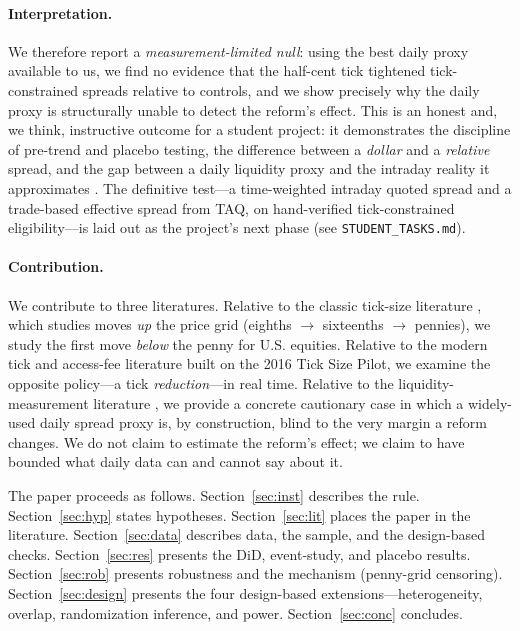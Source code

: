 \documentclass[12pt]{article}
\begin{document}
\paragraph{Interpretation.} We therefore report a \emph{measurement-limited null}: using the
best daily proxy available to us, we find no evidence that the half-cent tick tightened
tick-constrained spreads relative to controls, and we show precisely why the daily proxy is
structurally unable to detect the reform's effect. This is an honest and, we think,
instructive outcome for a student project: it demonstrates the discipline of pre-trend and
placebo testing, the difference between a \emph{dollar} and a \emph{relative} spread, and the
gap between a daily liquidity proxy and the intraday reality it approximates
\citep{holden2014,chung2014}. The definitive test---a time-weighted intraday quoted spread
and a trade-based effective spread from TAQ, on hand-verified tick-constrained eligibility---is
laid out as the project's next phase (see \texttt{STUDENT\_TASKS.md}).

\paragraph{Contribution.} We contribute to three literatures. Relative to the classic
tick-size literature \citep{harris1994,angel1997,goldstein2000,bessembinder2003}, which
studies moves \emph{up} the price grid (eighths $\to$ sixteenths $\to$ pennies), we study
the first move \emph{below} the penny for U.S. equities. Relative to the modern tick and
access-fee literature \citep{ohara2019,comerton2019,albuquerque2020} built on the 2016 Tick
Size Pilot, we examine the opposite policy---a tick \emph{reduction}---in real time.
Relative to the liquidity-measurement literature \citep{corwin2012,chung2014,holden2014}, we
provide a concrete cautionary case in which a widely-used daily spread proxy is, by
construction, blind to the very margin a reform changes. We do not claim to estimate the
reform's effect; we claim to have bounded what daily data can and cannot say about it.

The paper proceeds as follows. Section~\ref{sec:inst} describes the rule. Section~\ref{sec:hyp}
states hypotheses. Section~\ref{sec:lit} places the paper in the literature.
Section~\ref{sec:data} describes data, the sample, and the design-based checks.
Section~\ref{sec:res} presents the DiD, event-study, and placebo results.
Section~\ref{sec:rob} presents robustness and the mechanism (penny-grid censoring).
Section~\ref{sec:design} presents the four design-based extensions---heterogeneity, overlap,
randomization inference, and power. Section~\ref{sec:conc} concludes.
\end{document}
